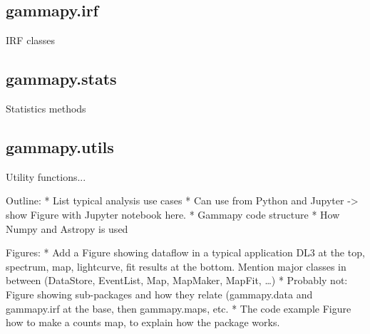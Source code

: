\subsection{gammapy.irf}
IRF classes

\subsection{gammapy.stats}
Statistics methods


\subsection{gammapy.utils}
Utility functions...


Outline:
* List typical analysis use cases
* Can use from Python and Jupyter -> show Figure with Jupyter notebook here.
* Gammapy code structure
* How Numpy and Astropy is used


Figures:
* Add a Figure showing dataflow in a typical application
DL3 at the top, spectrum, map, lightcurve, fit results at the bottom.
Mention major classes in between (DataStore, EventList, Map, MapMaker, MapFit, …)
* Probably not: Figure showing sub-packages and how they relate (gammapy.data and gammapy.irf at the base, then gammapy.maps, etc.
* The code example Figure how to make a counts map, to explain how the package works.
